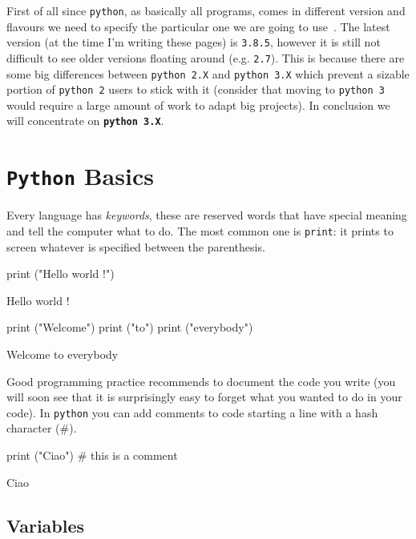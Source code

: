First of all since \texttt{python}, as basically all programs, comes in different version and flavours we need to specify the particular one we are going to use~\cite{python_versions}.
The latest version (at the time I'm writing these pages) is \texttt{3.8.5}, however it is still not difficult to see older versions floating around (e.g. \texttt{2.7}).
This is because there are some big differences between \texttt{python 2.X} and \texttt{python 3.X} which prevent a sizable portion of \texttt{python 2} users to stick with it (consider that moving to \texttt{python 3} would require a large amount of work to adapt big projects).
In conclusion we will concentrate on \textbf{\texttt{python~3.X}}.

\section{\texttt{Python} Basics}
\label{python-basics}

Every language has \emph{keywords}, these are reserved words that have special meaning and tell the computer what to do. The most common one is \texttt{print}: it prints to screen whatever is specified between the parenthesis.

\begin{ipython}
print ("Hello world !")
\end{ipython}
\begin{ioutput}
Hello world !
\end{ioutput}
\begin{ipython}
print ("Welcome")
print ("to")
print ("everybody")
\end{ipython}
\begin{ioutput}
Welcome
to
everybody
\end{ioutput}

Good programming practice recommends to document the code you write (you will soon see that it is surprisingly easy to forget what you wanted to do in your code). In \texttt{python} you can add comments to code starting a line with a hash character (\#).

\begin{ipython}
print ("Ciao") # this is a comment 
\end{ipython}
\begin{ioutput}
Ciao
\end{ioutput}

\subsection{Variables}\label{variables}

